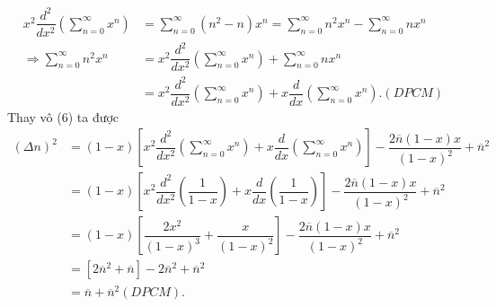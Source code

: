 \documentclass{report}
\newcommand{\f}[2]{\dfrac{#1}{#2}}
\begin{document}
\begin{align*}
	x^2 \f{d^2}{dx^2} \left( \sum_{n = 0}^{\infty} x^{n} \right)
	& = \sum_{n = 0}^{\infty} (n^2-n) x^{n}
	= \sum_{n = 0}^{\infty} n^2 x^{n} - \sum_{n = 0}^{\infty} nx^{n}                                                                           \\
	\Rightarrow \sum_{n = 0}^{\infty} n^2 x^{n}
	& = x^2 \f{d^2}{dx^2} \left( \sum_{n = 0}^{\infty} x^{n} \right) + \sum_{n = 0}^{\infty} nx^{n}                                           \\
	& = x^2 \f{d^2}{dx^2} \left( \sum_{n = 0}^{\infty} x^{n} \right) + x \f{d}{dx} \left( \sum_{n = 0}^{\infty} x^{n} \right) .(DPCM) \tag{8}
\end{align*}
Thay vô (6) ta được
\begin{align*}
	(\Delta n)^2
	& = (1-x) \left[x^2 \f{d^2}{dx^2} \left( \sum_{n = 0}^{\infty} x^{n} \right) + x \f{d}{dx} \left( \sum_{n = 0}^{\infty} x^{n} \right)\right] - \f{2\overline{n}(1-x)x}{(1 - x)^2} + \overline{n}^2 \\
	& = (1-x) \left[x^2 \f{d^2}{dx^2} \left( \f{1}{1 - x} \right) + x \f{d}{dx} \left( \f{1}{1 - x} \right)\right] - \f{2\overline{n}(1-x)x}{(1 - x)^2} + \overline{n}^2                               \\
	& = (1-x) \left[\f{2x^2}{(1-x)^3} + \f{x}{(1 - x)^2}\right] - \f{2\overline{n}(1-x)x}{(1 - x)^2} + \overline{n}^2                                                                                  \\
	& = \left[2 \overline{n}^2 + \overline{n}\right] - 2 \overline{n}^2 + \overline{n}^2                                                                                                               \\
	& = \overline{n} + \overline{n}^2 (DPCM).\tag{9}
\end{align*}
\end{document}
